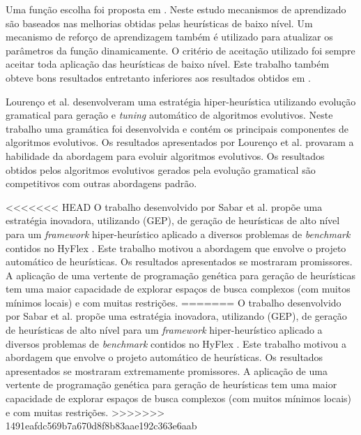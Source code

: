 Uma função escolha foi proposta em \cite{drake2012improved}. Neste estudo mecanismos de aprendizado são baseados nas melhorias obtidas pelas heurísticas de baixo nível. Um mecanismo de reforço de aprendizagem também é utilizado para atualizar os parâmetros da função dinamicamente. O critério de aceitação utilizado foi sempre aceitar toda aplicação das heurísticas de baixo nível. Este trabalho também obteve bons resultados entretanto inferiores aos resultados obtidos em \cite{misir2012intelligent}.




Lourenço et al. \cite{lourencco2012evolving} desenvolveram uma estratégia hiper-heurística utilizando evolução gramatical para geração e \textit{tuning} automático de algoritmos evolutivos. Neste trabalho uma gramática foi desenvolvida e contém os principais componentes de algoritmos evolutivos. Os resultados apresentados por Lourenço et al. provaram a habilidade da abordagem para evoluir algoritmos evolutivos. Os resultados obtidos pelos algoritmos evolutivos gerados pela evolução gramatical são competitivos com outras abordagens padrão. 


<<<<<<< HEAD
O trabalho desenvolvido por Sabar et al. \cite{sabar2015automatic} propõe uma estratégia inovadora, utilizando  (GEP), de geração de heurísticas de alto nível para um \textit {framework} hiper-heurístico aplicado a diversos problemas de \textit{benchmark} contidos no  HyFlex \cite{ochoa2012hyflex}. Este trabalho motivou a abordagem que envolve o projeto automático de heurísticas. Os resultados apresentados se mostraram  promissores. A aplicação de uma vertente de programação genética para geração de heurísticas tem uma maior capacidade de explorar espaços de busca complexos (com muitos mínimos locais) e com muitas restrições.
=======
O trabalho desenvolvido por Sabar et al. \cite{sabar2015automatic} propõe uma estratégia inovadora, utilizando  (GEP), de geração de heurísticas de alto nível para um \textit {framework} hiper-heurístico aplicado a diversos problemas de \textit{benchmark} contidos no  HyFlex \cite{ochoa2012hyflex}. Este trabalho motivou a abordagem que envolve o projeto automático de heurísticas. Os resultados apresentados se mostraram extremamente promissores. A aplicação de uma vertente de programação genética para geração de heurísticas tem uma maior capacidade de explorar espaços de busca complexos (com muitos mínimos locais) e com muitas restrições.
>>>>>>> 1491eafdc569b7a670d8f8b83aae192c363e6aab


